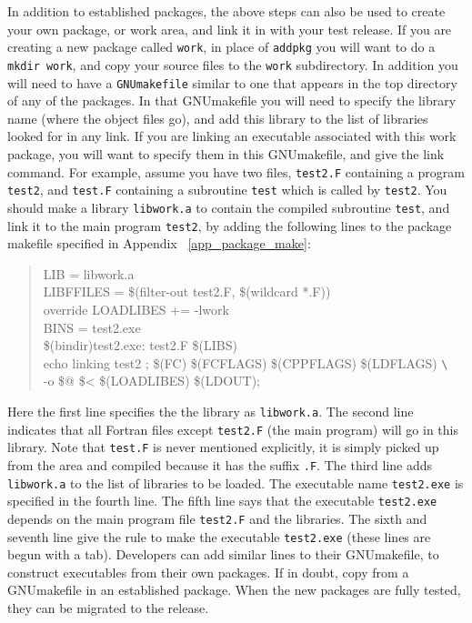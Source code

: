 \documentclass[12pt]{article}
\begin{document}
In addition to established packages, the above steps can also be used to create 
your own package, or work area, and link it in with your test release.  If you 
are creating a new package called \texttt{work}, in place of \texttt{addpkg} 
you will want to do a \texttt{mkdir work}, and copy your source files to the 
\texttt{work} subdirectory.  In addition you will need to have 
a \texttt{GNUmakefile} similar to one that appears in the top directory of any 
of the packages.  In that GNUmakefile you will need to specify the library
name (where the object files go), and add this library to the list of libraries
looked for in any link. If you are linking an executable associated
with this work package, you will want to specify them in this GNUmakefile,
and give the link command.  For example, assume you have two files, \texttt{test2.F}
containing a program \texttt{test2}, and \texttt{test.F} containing a 
subroutine \texttt{test} which is called by \texttt{test2}.
You should make a library \texttt{libwork.a} to contain the compiled subroutine 
\texttt{test}, and link it to the main program \texttt{test2}, by 
adding the following lines to the package makefile specified in 
Appendix ~\ref{app_package_make}:
\begin{quote}
\ttfamily
LIB = libwork.a  \\
LIBFFILES  = \$(filter-out test2.F, \$(wildcard *.F))  \\
override LOADLIBES += -lwork                         \\ 
BINS = test2.exe                                     \\
\$(bindir)test2.exe: test2.F \$(LIBS)                \\
\hspace*{0.3in} echo linking test2 ; \$(FC) \$(FCFLAGS) \$(CPPFLAGS) \$(LDFLAGS) \verb+\+ \\
\hspace*{0.3in} -o \$@ \$< \$(LOADLIBES) \$(LDOUT);\\
\end{quote} 
Here the first line specifies the the library as \texttt{libwork.a}. The 
second
line indicates that all Fortran files except \texttt{test2.F} (the main 
program) will go in
this library. Note that \texttt{test.F} is never mentioned explicitly, it is
simply picked up from the area and compiled because it has the suffix
\texttt{.F}. The third line adds \texttt{libwork.a} to the list of libraries 
to be loaded.
The executable name \texttt{test2.exe} is specified in the fourth line.  The 
fifth line says
that the executable \texttt{test2.exe} depends on the main program file 
\texttt{test2.F} and the 
libraries.  The sixth and seventh line give the rule to make the executable
\texttt{test2.exe} (these lines are begun with a tab).  Developers can add 
similar lines to their GNUmakefile, to 
construct executables from their own packages.  If in doubt, copy from 
a GNUmakefile in an established package. When the new 
packages are fully
tested, they can be migrated to the release.
\end{document}
